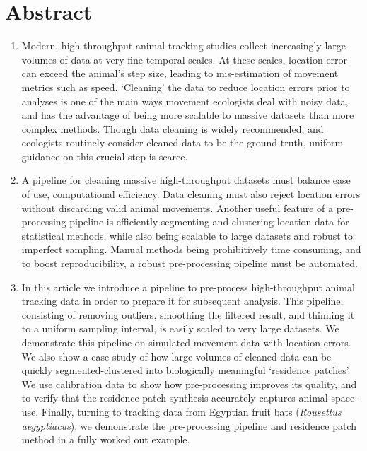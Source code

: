 \documentclass[10pt,paper=a4,headings=standardclasses
]{scrartcl}
\begin{document}
\newpage

\linenumbers

\section*{Abstract} %
\noindent
\begin{enumerate}
    \item Modern, high-throughput animal tracking studies collect increasingly large volumes of data at very fine temporal scales.
    At these scales, location-error can exceed the animal's step size, leading to mis-estimation of movement metrics such as speed.
    `Cleaning' the data to reduce location errors prior to analyses is one of the main ways movement ecologists deal with noisy data, and has the advantage of being more scalable to massive datasets than more complex methods.
    Though data cleaning is widely recommended, and ecologists routinely consider cleaned data to be the ground-truth, uniform guidance on this crucial step is scarce.
    
    \item A pipeline for cleaning massive high-throughput datasets must balance ease of use, computational efficiency.
    Data cleaning must also reject location errors without discarding valid animal movements.
    Another useful feature of a pre-processing pipeline is efficiently segmenting and clustering location data for statistical methods, while also being scalable to large datasets and robust to imperfect sampling.
    Manual methods being prohibitively time consuming, and to boost reproducibility, a robust pre-processing pipeline must be automated.
    
    \item In this article we introduce a pipeline to pre-process high-throughput animal tracking data in order to prepare it for subsequent analysis.
    This pipeline, consisting of removing outliers, smoothing the filtered result, and thinning it to a uniform sampling interval, is easily scaled to very large datasets.
    We demonstrate this pipeline on simulated movement data with location errors.
    We also show a case study of how large volumes of cleaned data can be quickly segmented-clustered into biologically meaningful ‘residence patches’.
    We use calibration data to show how pre-processing improves its quality, and to verify that the residence patch synthesis accurately captures animal space-use.
    Finally, turning to tracking data from Egyptian fruit bats (\textit{Rousettus aegyptiacus}), we demonstrate the pre-processing pipeline and residence patch method in a fully worked out example.
    

\end{enumerate}
\end{document}
